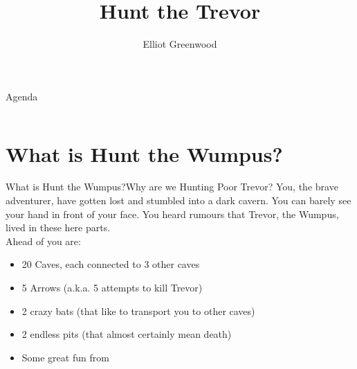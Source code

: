 \documentclass{beamer}
\begin{document}
\title{Hunt the Trevor}
\author{Elliot Greenwood}
\date{}
  \begin{frame}[fragile]
    \titlepage%
  \end{frame}
  \begin{frame}{Agenda}
    \begin{columns}[t]
      \begin{column}{.5\textwidth}
        \tableofcontents[sections={1-3}]
      \end{column}
      \begin{column}{.4\textwidth}
        \tableofcontents[sections={4-6}]
      \end{column}
    \end{columns}
  \end{frame}
  \section{What is Hunt the Wumpus?}
  \begin{frame}{What is Hunt the Wumpus?}{Why are we Hunting Poor Trevor?}
    You, the brave adventurer, have gotten lost and stumbled into a dark cavern.
    You can barely see your hand in front of your face.
    You heard rumours that Trevor, the Wumpus, lived in these here parts.\\[1em]
    Ahead of you are:
    \begin{itemize}[<+-| alert@+>]
      \item 20 Caves, each connected to 3 other caves
      \item 5 Arrows (a.k.a. 5 attempts to kill Trevor)
      \item 2 crazy bats (that like to transport you to other caves)
      \item 2 endless pits (that almost certainly mean death)
      \item Some great fun from 
    \end{itemize}
    \\
  \end{frame}
\end{document}
